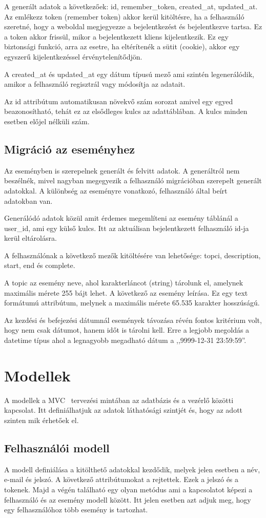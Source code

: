 \documentclass[
]{thesis-ekf}
\theoremstyle{definition}
\theoremstyle{remark}
\begin{document}
A generált adatok a következőek: id, remember\_token, created\_at, updated\_at. Az emlékezz token (remember token) akkor kerül kitöltésre, ha a felhasználó szeretné, hogy a weboldal megjegyezze a bejelentkezést és bejelentkezve tartsa. Ez a token akkor frissül, mikor a bejelentkezett kliens kijelentkezik. Ez egy biztonsági funkció, arra az esetre, ha eltérítenék a sütit (cookie), akkor egy egyszerű kijelentkezéssel érvénytelenítődjön. 

A created\_at és updated\_at egy dátum típusú mező ami szintén legenerálódik, amikor a felhasználó regisztrál vagy módosítja az adatait. 

Az id attribútum automatikusan növekvő szám sorozat amivel egy egyed beazonosítható, tehát ez az elsődleges kulcs az adattáblában.  A kulcs minden esetben előjel nélküli szám.
\subsection{Migráció az eseményhez}
Az eseményben is szerepelnek generált és felvitt adatok. A generáltról nem beszélnék, mivel nagyban megegyezik a felhasználó migrációban szerepelt generált adatokkal. A különbség az eseményre vonatkozó, felhasználó által beírt adatokban van. 

Generálódó adatok közül amit érdemes megemlíteni az esemény táblánál a user\_id, ami egy külső kulcs. Itt az aktuálisan bejelentkezett felhasználó id-ja kerül eltárolásra. 

A felhasználónak a következő mezők kitöltésére van lehetősége: topci, description, start, end és complete. 

A topic az esemény neve, ahol karakterláncot (string) tárolunk el, amelynek maximális mérete 255 bájt lehet. A következő az esemény leírása. Ez egy text formátumú attribútum, melynek a maximális mérete 65.535 karakter hosszúságú.

Az kezdési és befejezési dátumnál események távozása révén fontos kritérium volt, hogy nem csak dátumot, hanem időt is tárolni kell. Erre a legjobb megoldás a datetime típus ahol a legnagyobb megadható dátum a ,,9999-12-31 23:59:59''.

\section{Modellek}
A modellek a MVC~\cite{mvc_mozzilla} tervezési mintában az adatbázis és a vezérlő közötti kapcsolat. Itt definiálhatjuk az adatok láthatósági szintjét és, hogy az adott szinten mik érhetőek el.
\subsection{Felhasználói modell}
A modell definiálása a kitölthető adatokkal kezdődik, melyek jelen esetben a név, e-mail és jelszó. A következő attribútumokat a rejtettek. Ezek a jelszó és a tokenek. Majd a végén található egy olyan metódus ami a kapcsolatot képezi a felhasználó és az esemény modell között. Itt jelen esetben azt adjuk meg, hogy egy felhasználóhoz több esemény is tartozhat.
\end{document}
